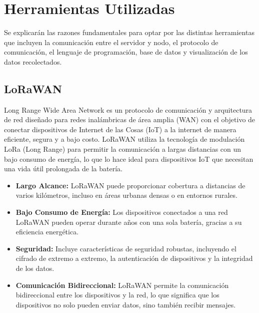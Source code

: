 \fancyhead{}
\fancyfoot{}
\cfoot{\thepage}


\chapter{Herramientas Utilizadas}

Se explicarán las razones fundamentales para optar por las distintas herramientas que incluyen la comunicación entre el servidor y nodo, el protocolo de comunicación,  el lenguaje de programación, base de datos y visualización de los datos recolectados.

\section{LoRaWAN}
Long Range Wide Area Network \cite{gutierrez2011aplicacion} es un protocolo de comunicación y arquitectura de red diseñado para redes inalámbricas de área amplia (WAN) con el objetivo de conectar dispositivos de Internet de las Cosas (IoT) a la internet de manera eficiente, segura y a bajo costo. LoRaWAN utiliza la tecnología de modulación LoRa (Long Range) para permitir la comunicación a largas distancias con un bajo consumo de energía, lo que lo hace ideal para dispositivos IoT que necesitan una vida útil prolongada de la batería.
\begin{itemize}
    \item \textbf{Largo Alcance:} LoRaWAN puede proporcionar cobertura a distancias de varios kilómetros, incluso en áreas urbanas densas o en entornos rurales.
    \item \textbf{Bajo Consumo de Energía:} Los dispositivos conectados a una red LoRaWAN pueden operar durante años con una sola batería, gracias a su eficiencia energética.
    \item \textbf{Seguridad:} Incluye características de seguridad robustas, incluyendo el cifrado de extremo a extremo, la autenticación de dispositivos y la integridad de los datos.
    \item \textbf{Comunicación Bidireccional:} LoRaWAN permite la comunicación bidireccional entre los dispositivos y la red, lo que significa que los dispositivos no solo pueden enviar datos, sino también recibir mensajes.
\end{itemize}

